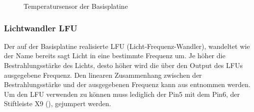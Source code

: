 \begin{figure}[H]
    \centering
    \qquad
    \qquad
    \caption[Temperatursensor der Basisplatine]{Temperatursensor der \gls{Basisplatine}}
    \label{fig:basisplatine-temp}
\end{figure}

\subsubsection{Lichtwandler LFU}
Der auf der \gls{Basisplatine} realisierte LFU (Licht-Frequenz-Wandler), wandeltet wie der Name bereits sagt Licht in eine bestimmte Frequenz um. Je höher die Bestrahlungsstärke des Lichts, desto höher wird die über den Output des LFUs ausgegebene Frequenz. Den linearen Zusammenhang zwischen der Bestrahlungsstärke und der ausgegebenen Frequenz kann aus  entnommen werden. Um den LFU verwenden zu können muss lediglich der Pin5 mit dem Pin6, der Stiftleiste X9 (), gejumpert werden.

